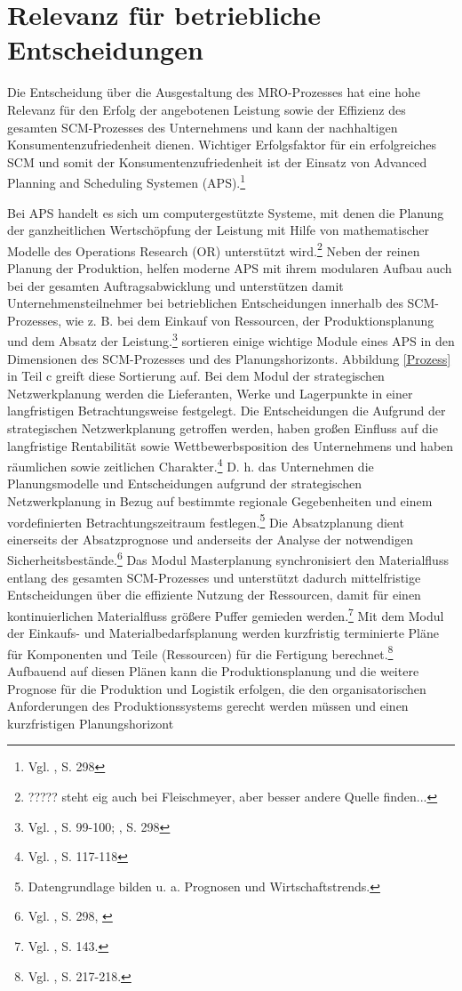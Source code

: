 \section{Relevanz für betriebliche Entscheidungen}

Die Entscheidung über die Ausgestaltung des MRO-Prozesses hat eine hohe Relevanz für den Erfolg der angebotenen Leistung sowie der Effizienz des gesamten SCM-Prozesses des Unternehmens und kann der nachhaltigen Konsumentenzufriedenheit dienen. Wichtiger Erfolgsfaktor für ein erfolgreiches SCM und somit der Konsumentenzufriedenheit ist der Einsatz von Advanced Planning and Scheduling Systemen (APS).\footnote{Vgl. \cite{fleischmeyr2004codp}, S. 298}

Bei APS handelt es sich um computergestützte Systeme, mit denen die Planung der ganzheitlichen Wertschöpfung der Leistung mit Hilfe von mathematischer Modelle des Operations Research (OR) unterstützt wird.\footnote{????? steht eig auch bei Fleischmeyer, aber besser andere Quelle finden...} Neben der reinen Planung der Produktion, helfen moderne APS mit ihrem modularen Aufbau auch bei der gesamten Auftragsabwicklung und unterstützen damit Unternehmensteilnehmer bei betrieblichen Entscheidungen innerhalb des SCM-Prozesses, wie z. B. bei dem Einkauf von Ressourcen, der Produktionsplanung und dem Absatz der Leistung.\footnote{Vgl. \cite{meyr2015structure}, S. 99-100; \cite{fleischmeyr2004codp}, S. 298} \cite{meyr2015structure} sortieren einige wichtige Module eines APS in den Dimensionen des SCM-Prozesses und des Planungshorizonts. Abbildung \ref{Prozess} in Teil c greift diese Sortierung auf. Bei dem Modul der strategischen Netzwerkplanung werden die Lieferanten, Werke und Lagerpunkte in einer langfristigen Betrachtungsweise festgelegt. Die Entscheidungen die Aufgrund der strategischen Netzwerkplanung getroffen werden, haben großen Einfluss auf die langfristige Rentabilität sowie Wettbewerbsposition des Unternehmens und haben räumlichen sowie zeitlichen Charakter.\footnote{Vgl. \cite{goetschalckx2005strategic}, S. 117-118} D. h. das Unternehmen die Planungsmodelle und Entscheidungen aufgrund der strategischen Netzwerkplanung in Bezug auf bestimmte regionale Gegebenheiten und einem vordefinierten Betrachtungszeitraum festlegen.\footnote{Datengrundlage bilden u. a. Prognosen und Wirtschaftstrends.} Die Absatzplanung dient einerseits der Absatzprognose und anderseits der Analyse der notwendigen Sicherheitsbestände.\footnote{Vgl. \cite{fleischmeyr2004codp}, S. 298, \label{fleisch}} Das Modul Masterplanung synchronisiert den Materialfluss entlang des gesamten SCM-Prozesses und unterstützt dadurch mittelfristige Entscheidungen über die effiziente Nutzung der Ressourcen, damit für einen kontinuierlichen Materialfluss größere Puffer gemieden werden.\footnote{Vgl. \cite{rohde2002scm}, S. 143.} Mit dem Modul der Einkaufs- und Materialbedarfsplanung werden kurzfristig terminierte Pläne für Komponenten und Teile (Ressourcen) für die Fertigung berechnet.\footnote{Vgl. \cite{stadler2008aps}, S. 217-218.} Aufbauend auf diesen Plänen kann die Produktionsplanung und die weitere Prognose für die Produktion und Logistik erfolgen, die den organisatorischen Anforderungen des Produktionssystems gerecht werden müssen und einen kurzfristigen Planungshorizont 